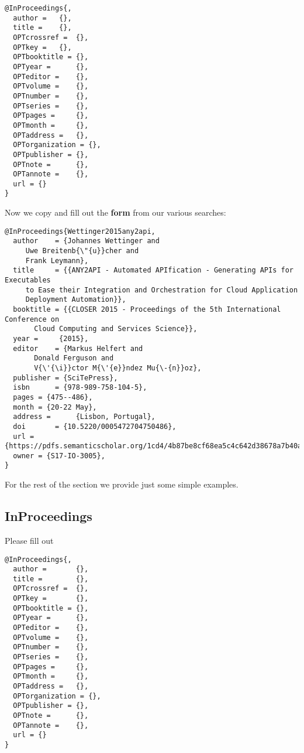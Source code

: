 \begin{verbatim}
@InProceedings{,
  author =   {},
  title =    {},
  OPTcrossref =  {},
  OPTkey =   {},
  OPTbooktitle = {},
  OPTyear =      {},
  OPTeditor =    {},
  OPTvolume =    {},
  OPTnumber =    {},
  OPTseries =    {},
  OPTpages =     {},
  OPTmonth =     {},
  OPTaddress =   {},
  OPTorganization = {},
  OPTpublisher = {},
  OPTnote =      {},
  OPTannote =    {},
  url = {}
}
\end{verbatim}

Now we copy and fill out the \textbf{form} from our various searches:

\begin{verbatim}
@InProceedings{Wettinger2015any2api,    
  author    = {Johannes Wettinger and
     Uwe Breitenb{\"{u}}cher and
     Frank Leymann},
  title     = {{ANY2API - Automated APIfication - Generating APIs for Executables
     to Ease their Integration and Orchestration for Cloud Application
     Deployment Automation}},
  booktitle = {{CLOSER 2015 - Proceedings of the 5th International Conference on
       Cloud Computing and Services Science}},
  year =     {2015},
  editor    = {Markus Helfert and
       Donald Ferguson and
       V{\'{\i}}ctor M{\'{e}}ndez Mu{\-{n}}oz},
  publisher = {SciTePress},
  isbn      = {978-989-758-104-5},
  pages = {475--486},
  month = {20-22 May},
  address =      {Lisbon, Portugal},
  doi       = {10.5220/0005472704750486},
  url ={https://pdfs.semanticscholar.org/1cd4/4b87be8cf68ea5c4c642d38678a7b40a86de.pdf},
  owner = {S17-IO-3005},
}
\end{verbatim}


For the rest of the section we provide just some simple examples.

\subsection{InProceedings}\label{s:e:inproceedings}

Please fill out

\begin{verbatim}
@InProceedings{,
  author =       {},
  title =        {},
  OPTcrossref =  {},
  OPTkey =       {},
  OPTbooktitle = {},
  OPTyear =      {},
  OPTeditor =    {},
  OPTvolume =    {},
  OPTnumber =    {},
  OPTseries =    {},
  OPTpages =     {},
  OPTmonth =     {},
  OPTaddress =   {},
  OPTorganization = {},
  OPTpublisher = {},
  OPTnote =      {},
  OPTannote =    {},
  url = {}
}
\end{verbatim}

